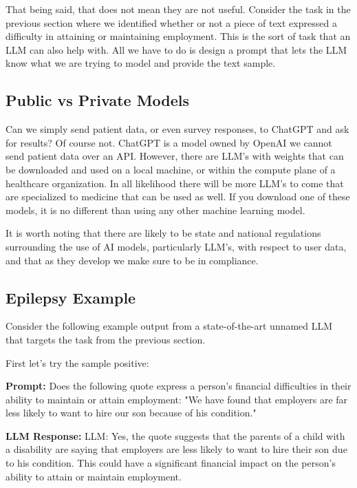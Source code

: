 That being said, that does not mean they are not useful. Consider the task in the previous section where we identified whether or not a piece of text
expressed a difficulty in attaining or maintaining employment. This is the sort of task that an LLM can also help with. All we have to do
is design a prompt that lets the LLM know what we are trying to model and provide the text sample.

\subsection{Public vs Private Models}

Can we simply send patient data, or even survey responses, to ChatGPT and ask for results? Of course not. ChatGPT is a model owned by OpenAI we cannot send
patient data over an API. However, there are LLM's with weights that can be downloaded and used on a local machine, or within the compute plane of a healthcare
organization. In all likelihood there will be more LLM's to come that are specialized to medicine that can be used as well. If you download one of these models,
it is no different than using any other machine learning model.

It is worth noting that there are likely to be state and national regulations surrounding the use of AI models, particularly LLM's, with respect to user data, and
that as they develop we make sure to be in compliance.

\subsection{Epilepsy Example}

Consider the following example output from a state-of-the-art unnamed LLM that targets the task from the previous section.

First let's try the sample positive:

\begin{displayquote}
  \textbf{Prompt:} Does the following quote express a person's financial difficulties in their ability to maintain or attain employment: "We have found that employers are far less likely to want to hire our son because of his condition."
\end{displayquote}

\begin{displayquote}
  \textbf{LLM Response:} LLM: Yes, the quote suggests that the parents of a child with a disability are saying that employers are less likely to want to hire their son due to his condition. This could have a significant financial impact on the person's ability to attain or maintain employment.
\end{displayquote}


